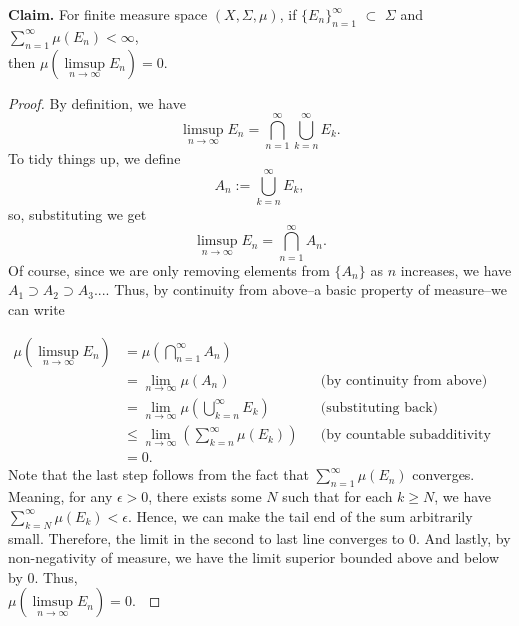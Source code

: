 \documentclass{article}
\begin{document}
\textbf{Claim.} For finite measure space $(X, \Sigma, \mu)$, if $\{E_n\}_{n=1}^{\infty}$ $\subset$ $\Sigma$ and 
$\sum\limits_{n=1}^{\infty} \mu(E_n) < \infty$, \\ then $\mu(\limsup\limits_{n\rightarrow\infty} E_n) = 0$.

\begin{proof}
By definition, we have $$\limsup\limits_{n\rightarrow\infty} E_n = \bigcap\limits_{n=1}^{\infty} \bigcup\limits_{k=n}^{\infty} E_k.$$
To tidy things up, we define $$ A_n := \bigcup\limits_{k = n}^{\infty} E_k,$$ so, substituting we get 
$$\limsup\limits_{n\rightarrow\infty} E_n = \bigcap\limits_{n=1}^{\infty} A_n.$$ 
Of course, since we are only removing elements from $\{A_n\}$ as $n$ increases, we have
$A_1 \supset A_2 \supset A_3 ... $. Thus, by continuity from above--a basic property of measure--we can write 

\begin{align*}
    \mu(\limsup\limits_{n\rightarrow\infty} E_n) &= \mu(\bigcap\limits_{n=1}^{\infty} A_n) \\
    &= \lim_{n\rightarrow\infty} \mu(A_n) &&\text{(by continuity from above)}\\
    &= \lim_{n\rightarrow\infty} \mu(\bigcup\limits_{k = n}^{\infty} E_k) &&\text{(substituting back)} \\ 
    &\leq \lim_{n\rightarrow\infty}(\sum\limits_{k = n}^{\infty} \mu(E_k)) &&\text{(by countable subadditivity property of measure)} \\
    &= 0.
\end{align*}
Note that the last step follows from the fact that $\sum\limits_{n=1}^{\infty} \mu(E_n)$ converges. Meaning, for any $\epsilon > 0$, 
there exists some $N$ such that for each $k \geq N$, we have $\sum\limits_{k = N}^{\infty} \mu(E_k) < \epsilon$. 
Hence, we can make the tail end of the sum arbitrarily small. Therefore, the limit in the second to last line converges to 0. 
And lastly, by non-negativity of measure, we have the limit superior bounded above and below by 0. Thus, \\
$\mu(\limsup\limits_{n\rightarrow\infty} E_n) = 0$. $\qedhere$
\end{proof}
\end{document}
